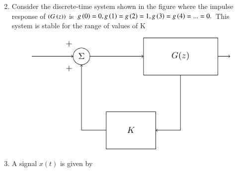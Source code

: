 \documentclass[journal]{IEEEtran}
\begin{document}
\begin{enumerate}
\begin{enumerate}
\begin{multicols}{2}
				\end{multicols}
		\end{enumerate}
	\item Consider the discrete-time system shown in the figure where the impulse response of $\left(G\left(z\right)\right)$ is $g\left(0\right)=0, g\left(1\right)=g\left(2\right)=1, g\left(3\right)=g\left(4\right)=...=0.$ This system is stable for the range of values of K
\begin{figure}[H]
			\centering
			\includegraphics[scale=0.75]{figs/fig36.png}
			\label{stemplot}
		\end{figure}
		\begin{enumerate}
		\end{enumerate}
	\item A signal $x(t)$ is given by


\end{enumerate}
\end{document}
